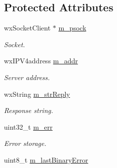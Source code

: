 \subsection*{Protected Attributes}
\begin{DoxyCompactItemize}
\item 
\hypertarget{class_vscp_tcp_if_a77ec5c63e5ce4f8b3684e22f22375284}{
wxSocketClient $\ast$ \hyperlink{class_vscp_tcp_if_a77ec5c63e5ce4f8b3684e22f22375284}{m\_\-psock}}
\label{de/d84/class_vscp_tcp_if_a77ec5c63e5ce4f8b3684e22f22375284}

\begin{DoxyCompactList}\small\item\em Socket. \end{DoxyCompactList}\item 
\hypertarget{class_vscp_tcp_if_ae3dcc5ad067785abc04551f44327d791}{
wxIPV4address \hyperlink{class_vscp_tcp_if_ae3dcc5ad067785abc04551f44327d791}{m\_\-addr}}
\label{de/d84/class_vscp_tcp_if_ae3dcc5ad067785abc04551f44327d791}

\begin{DoxyCompactList}\small\item\em Server address. \end{DoxyCompactList}\item 
\hypertarget{class_vscp_tcp_if_a862145f86db13329c00d099ed6147029}{
wxString \hyperlink{class_vscp_tcp_if_a862145f86db13329c00d099ed6147029}{m\_\-strReply}}
\label{de/d84/class_vscp_tcp_if_a862145f86db13329c00d099ed6147029}

\begin{DoxyCompactList}\small\item\em Response string. \end{DoxyCompactList}\item 
\hypertarget{class_vscp_tcp_if_a8c4071c9ac95f544eac1f97cd1456219}{
uint32\_\-t \hyperlink{class_vscp_tcp_if_a8c4071c9ac95f544eac1f97cd1456219}{m\_\-err}}
\label{de/d84/class_vscp_tcp_if_a8c4071c9ac95f544eac1f97cd1456219}

\begin{DoxyCompactList}\small\item\em Error storage. \end{DoxyCompactList}\item 
\hypertarget{class_vscp_tcp_if_a792e1e59b1f3a5cbbc611552e6d136e3}{
uint8\_\-t \hyperlink{class_vscp_tcp_if_a792e1e59b1f3a5cbbc611552e6d136e3}{m\_\-lastBinaryError}}
\label{de/d84/class_vscp_tcp_if_a792e1e59b1f3a5cbbc611552e6d136e3}


\end{DoxyCompactItemize}
